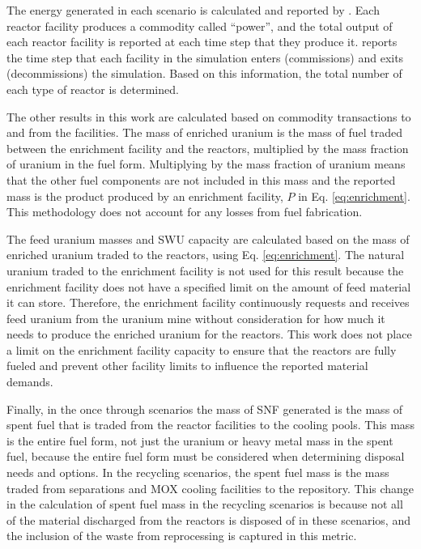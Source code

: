 The energy generated in each scenario is calculated and  
reported by \Cyclus. Each reactor facility produces a 
commodity called ``power'', and the total output of each reactor facility 
is reported at each time step that they produce it. 
\Cyclus reports the time step that each facility in the simulation enters 
(commissions) and exits (decommissions) the simulation. Based on 
this information, the total number of each type of reactor is 
determined. 

The other results in this work are calculated based on commodity 
transactions to and from the facilities. The mass of enriched 
uranium is the mass of fuel traded between the enrichment facility and 
the reactors, multiplied by the mass fraction of uranium in the fuel 
form. Multiplying by the mass fraction of uranium means that the other 
fuel components are not included in this mass and the reported mass is 
the product produced by an enrichment facility, $P$ in Eq. 
\ref{eq:enrichment}. This methodology does not account for any 
losses from fuel fabrication.

The feed uranium masses and \gls{SWU} capacity are calculated 
based on the mass of enriched uranium traded to the reactors, using 
Eq. \ref{eq:enrichment}. The natural uranium traded to the enrichment 
facility is not used for this result because the enrichment facility 
does not have a 
specified limit on the amount of feed material it can store. Therefore, 
the enrichment facility continuously requests and receives feed 
uranium from the uranium mine without consideration for how much it needs 
to produce the enriched uranium for the reactors. This work does not 
place a limit on the enrichment facility capacity to ensure that the 
reactors are fully fueled and prevent other facility limits to 
influence the reported material demands. 

Finally, in the once through scenarios the mass of \gls{SNF} generated is 
the mass of spent fuel that is 
traded from the reactor facilities to the cooling pools. This mass is the 
entire fuel form, not just the uranium or heavy metal mass in the spent 
fuel, because the entire fuel form must be considered when determining 
disposal needs and options. In the recycling scenarios, the spent fuel 
mass is the mass traded from separations and \gls{MOX} cooling facilities 
to the repository. This change in the calculation of spent fuel mass 
in the recycling scenarios is because not all of the material discharged 
from the reactors is disposed of in these scenarios, and the inclusion of 
the waste from reprocessing is captured in this metric.

